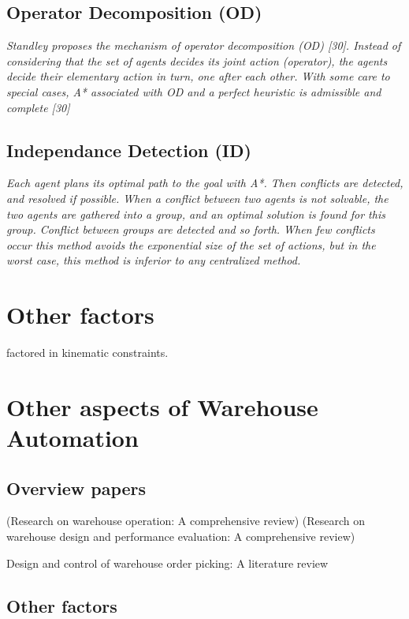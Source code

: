 \documentclass[a4paper,11pt]{article}
\begin{document}
\subsection{Operator Decomposition (OD)}
\textit{Standley proposes the mechanism of operator decomposition (OD) [30]. Instead of considering that the set of agents decides its joint action (operator), the agents decide their elementary action in turn, one after each other. With some care to special cases, A* associated with OD and a perfect heuristic is admissible and complete [30]}

\subsection{Independance Detection (ID)}
\textit{Each agent plans its optimal path to the goal with A*. Then conflicts are detected, and resolved if possible. When a conflict between two agents is not solvable, the two agents are gathered into a group, and an optimal solution is found for this group. Conflict between groups are detected and so forth. When few conflicts occur this method avoids the exponential size of the set of actions, but in the worst case, this method is inferior to any centralized method.}


\section{Other factors}
\cite{honig2016multi} factored in kinematic constraints.

\section{Other aspects of Warehouse Automation} \label{section:wa}

\subsection{Overview papers}
\cite{gu2007research} (Research on warehouse operation: A comprehensive review)
\cite{gu2010research} (Research on warehouse design and performance evaluation: A comprehensive review)

Design and control of warehouse order picking: A literature review

\subsection{Other factors}
\cite{correll2016lessons}
\end{document}
